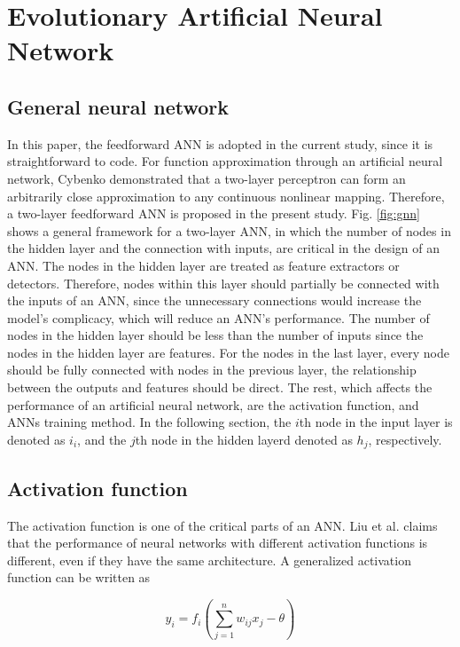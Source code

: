 \section{Evolutionary Artificial Neural Network}
\subsection{General neural network}

In this paper, the feedforward ANN is adopted in the current study, since it is
straightforward to code. For function approximation through an artificial neural
network, Cybenko demonstrated that a two-layer perceptron can form an
arbitrarily close approximation to any continuous nonlinear mapping\cite{cybenko1989approximation}.
Therefore, a two-layer feedforward ANN is proposed in the present study. Fig. \ref{fig:gnn}
shows a general framework for a two-layer ANN, in which the number of nodes in
the hidden layer and the connection with inputs, are critical in the design of
an ANN. The nodes in the hidden layer are treated as feature extractors or
detectors. Therefore, nodes within this layer should partially be connected with
the inputs of an ANN, since the unnecessary connections would increase the
model’s complicacy, which will reduce an ANN’s performance. The number of nodes
in the hidden layer should be less than the number of inputs since the nodes in
the hidden layer are features. For the nodes in the last layer, every node
should be fully connected with nodes in the previous layer, the relationship
between the outputs and features should be direct. The rest, which affects the
performance of an artificial neural network, are the activation function, and
ANNs training method. In the following section, the $i$th node in the
input layer is denoted as $i_i$, and the $j$th node in the hidden layerd denoted
as $h_j$, respectively.


\subsection{Activation function}

The activation function is one of the critical parts of an ANN. Liu
\cite{liu1996evolutionary} et al. claims that the performance of neural networks with
different activation functions is different, even if they have the same
architecture.  A generalized activation function can be written as

\begin{equation}
	y_i = f_i(\sum_{j=1}^n{w_{ij}x_j - \theta})
\end{equation}


